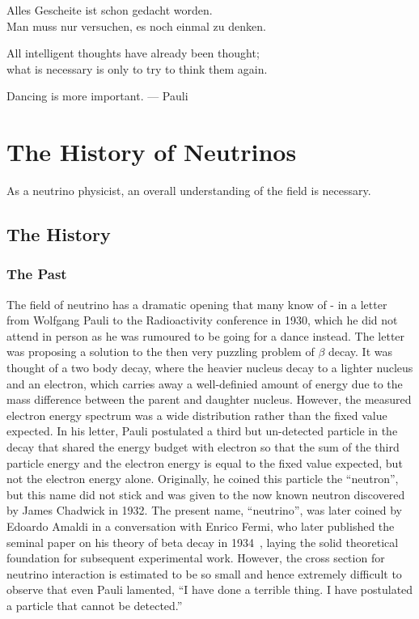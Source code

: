 \begin{savequote}[8cm]
Alles Gescheite ist schon gedacht worden.\\
Man muss nur versuchen, es noch einmal zu denken.

All intelligent thoughts have already been thought;\\
what is necessary is only to try to think them again.

Dancing is more important. --- Pauli
\end{savequote}

\chapter{\label{ch:nu-hist}The History of Neutrinos}
\minitoc

As a neutrino physicist, an overall understanding of the field is necessary.

\section{The History}
\subsection{The Past}
The field of neutrino has a dramatic opening that many know of - in a letter~\cite{Pauli:1930pc} from Wolfgang Pauli to the Radioactivity conference in 1930, which he did not attend in person as he was rumoured to be going for a dance instead. 
The letter was proposing a solution to the then very puzzling problem of $\beta$ decay.
It was thought of a two body decay, where the heavier nucleus decay to a lighter nucleus and an electron, which carries away a well-definied amount of energy due to the mass difference between the parent and daughter nucleus.  
However, the measured electron energy spectrum was a wide distribution rather than the fixed value expected. 
In his letter, Pauli postulated a third but un-detected particle in the decay that shared the energy budget with electron so that the sum of the third particle energy and the electron energy is equal to the fixed value expected, but not the electron energy alone. 
Originally, he coined this particle the ``neutron'', but this name did not stick and was given to the now known neutron discovered by James Chadwick in 1932.
The present name, ``neutrino'', was later coined by Edoardo Amaldi in a conversation with Enrico Fermi, who later published the seminal paper on his theory of beta decay in 1934~\cite{Fermi:1934hr}, laying the solid theoretical foundation for subsequent experimental work.
However, the cross section for neutrino interaction is estimated to be so small and hence extremely difficult to observe that even Pauli lamented, 
``I have done a terrible thing. I have postulated a particle that cannot be detected.''

